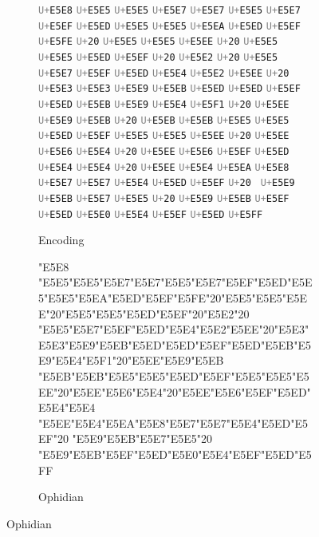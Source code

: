 \documentclass[letterpaper]{article}
\newcommand{\sampletext}[1]{{\samplefont\Large#1}}
\newcommand{\codepoint}[1]{{\tt\textcolor{gray}{U+}#1}}
\begin{document}
\begin{figure}
  \centering
  \caption{}
  \begin{subfigure}{1\textwidth}
    \centering
    \caption{Encoding}
      \codepoint{E5E8} \codepoint{E5E5} \codepoint{E5E5} \codepoint{E5E7} \codepoint{E5E7} \codepoint{E5E5} \codepoint{E5E7} \codepoint{E5EF} \codepoint{E5ED} \codepoint{E5E5} \codepoint{E5E5} \codepoint{E5EA} \codepoint{E5ED} \codepoint{E5EF} \codepoint{E5FE} \codepoint{20} \codepoint{E5E5} \codepoint{E5E5} \codepoint{E5EE} \codepoint{20} \codepoint{E5E5} \codepoint{E5E5} \codepoint{E5ED} \codepoint{E5EF} \codepoint{20} \codepoint{E5E2} \codepoint{20}
      \codepoint{E5E5} \codepoint{E5E7} \codepoint{E5EF} \codepoint{E5ED} \codepoint{E5E4} \codepoint{E5E2} \codepoint{E5EE} \codepoint{20} \codepoint{E5E3} \codepoint{E5E3} \codepoint{E5E9} \codepoint{E5EB} \codepoint{E5ED} \codepoint{E5ED} \codepoint{E5EF} \codepoint{E5ED} \codepoint{E5EB} \codepoint{E5E9} \codepoint{E5E4} \codepoint{E5F1} \codepoint{20} \codepoint{E5EE} \codepoint{E5E9} \codepoint{E5EB} \codepoint{20}
      \codepoint{E5EB} \codepoint{E5EB} \codepoint{E5E5} \codepoint{E5E5} \codepoint{E5ED} \codepoint{E5EF} \codepoint{E5E5} \codepoint{E5E5} \codepoint{E5EE} \codepoint{20} \codepoint{E5EE} \codepoint{E5E6} \codepoint{E5E4} \codepoint{20} \codepoint{E5EE} \codepoint{E5E6} \codepoint{E5EF} \codepoint{E5ED} \codepoint{E5E4} \codepoint{E5E4} \codepoint{20}
      \codepoint{E5EE} \codepoint{E5E4} \codepoint{E5EA} \codepoint{E5E8} \codepoint{E5E7} \codepoint{E5E7} \codepoint{E5E4} \codepoint{E5ED} \codepoint{E5EF} \codepoint{20  } \codepoint{E5E9} \codepoint{E5EB} \codepoint{E5E7} \codepoint{E5E5} \codepoint{20} \codepoint{E5E9} \codepoint{E5EB} \codepoint{E5EF} \codepoint{E5ED} \codepoint{E5E0} \codepoint{E5E4} \codepoint{E5EF} \codepoint{E5ED} \codepoint{E5FF}

  \end{subfigure}
  
  \medskip
  
  \begin{subfigure}{0.32\textwidth}
    \centering
    \caption{Ophidian}
    \sampletext{
      \char"E5E8 \char"E5E5\char"E5E5\char"E5E7\char"E5E7\char"E5E5\char"E5E7\char"E5EF\char"E5ED\char"E5E5\char"E5E5\char"E5EA\char"E5ED\char"E5EF\char"E5FE\char"20\char"E5E5\char"E5E5\char"E5EE\char"20\char"E5E5\char"E5E5\char"E5ED\char"E5EF\char"20\char"E5E2\char"20\\
      \char"E5E5\char"E5E7\char"E5EF\char"E5ED\char"E5E4\char"E5E2\char"E5EE\char"20\char"E5E3\char"E5E3\char"E5E9\char"E5EB\char"E5ED\char"E5ED\char"E5EF\char"E5ED\char"E5EB\char"E5E9\char"E5E4\char"E5F1\char"20\char"E5EE\char"E5E9\char"E5EB\\
      \char"E5EB\char"E5EB\char"E5E5\char"E5E5\char"E5ED\char"E5EF\char"E5E5\char"E5E5\char"E5EE\char"20\char"E5EE\char"E5E6\char"E5E4\char"20\char"E5EE\char"E5E6\char"E5EF\char"E5ED\char"E5E4\char"E5E4\\
      \char"E5EE\char"E5E4\char"E5EA\char"E5E8\char"E5E7\char"E5E7\char"E5E4\char"E5ED\char"E5EF\char"20  \char"E5E9\char"E5EB\char"E5E7\char"E5E5\char"20 \char"E5E9\char"E5EB\char"E5EF\char"E5ED\char"E5E0\char"E5E4\char"E5EF\char"E5ED\char"E5FF\\
      
}
\end{subfigure}
\end{figure}
\end{document}
